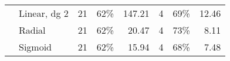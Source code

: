 \documentclass[10pt,letterpaper,oneside]{article}
\begin{document}
\begin{table}[]
\begin{tabular}{llrrrrrr}
		& Linear, dg 2                     & 21                                             & 62\%                                   & 147.21                                           & 4                          & 69\%               & 12.46                        \\
		& Radial                               & 21                                             & 62\%                                   & 20.47                                            & 4                          & 73\%               & 8.11                         \\
		& Sigmoid                               & 21                                             & 62\%                                   & 15.94                                            & 4                          & 68\%               & 7.48                         \\ \hline
	\end{tabular}
\end{table}
\end{document}
